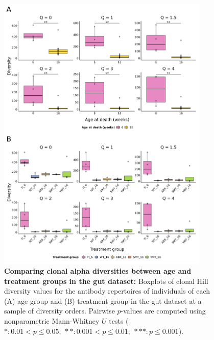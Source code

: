 \begin{figure}
\centering
\begin{subfigure}{0em}
\label{fig:igseq-gut-clone-diversity-solo-age}
\end{subfigure}
\begin{subfigure}{0em}
\label{fig:igseq-gut-clone-diversity-solo-groups}
\end{subfigure}
\includegraphics[width = 0.9\textwidth]{_Figures/png/igseq-gut-clone-diversity-solo-boxplots}
\caption[Comparing clonal alpha diversities between age and treatment groups in the \igseq gut dataset]{\textbf{Comparing clonal alpha diversities between age and treatment groups in the \igseq gut dataset:} Boxplots of clonal Hill diversity values for the antibody repertoires of individuals of each (A) age group and (B) treatment group in the \igseq gut dataset at a sample of diversity orders. Pairwise $p$-values are computed using nonparametric Mann-Whitney $U$ tests ($*: 0.01 < p \leq 0.05;~**: 0.001 < p \leq 0.01;~***: p \leq 0.001$).}
\label{fig:igseq-gut-VJ-diversity-solo-boxplots}
\end{figure}

